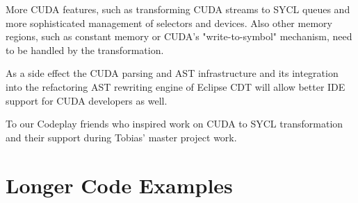 \documentclass[sigconf]{acmart}
\newcommand{\inputcode}[2]{}
\newcommand{\inputsycl}[2]{}
\newcommand{\tcode}[1]{\texttt{#1}}
\begin{document}
More CUDA features, such as transforming CUDA streams to SYCL queues and more sophisticated management of selectors and devices. Also other memory regions, such as constant memory or CUDA's "write-to-symbol" mechanism, need to be handled by the transformation. 

As a side effect the CUDA parsing and AST infrastructure and its integration into the refactoring AST rewriting engine of Eclipse CDT will allow better IDE support for CUDA developers as well. 


%
\begin{acks}
To our Codeplay friends who inspired work on CUDA to SYCL transformation and their support during Tobias' master project work.
\end{acks}

%



% 
\appendix

\section{Longer Code Examples}
\lstset{basicstyle=\footnotesize\ttfamily}
\inputcode{cuda-main.cpp}{\tcode{main()} calling CUDA matrix multiplication kernel}

\inputsycl{sycl-matrix-main.cpp}{Complete converted SYCL matrix multiplication}
\end{document}

